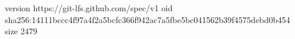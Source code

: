 version https://git-lfs.github.com/spec/v1
oid sha256:14111bccc4f97a4f2a5bcfc366f942ac7a5fbe5bc041562b39f4575debd0b454
size 2479
